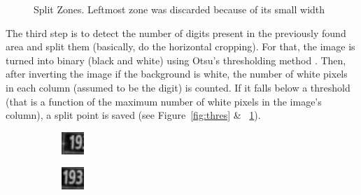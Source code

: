 \documentclass{article} %
\begin{document}
\begin{figure}[!htb]
  \caption{Split Zones. Leftmost zone was discarded because of its small width}
  \label{fig:split}
\endminipage\hfill
\end{figure}

The third step is to detect the number of digits present in the previously found area and split them (basically, do the horizontal cropping). For that, the image is turned into binary (black and white) using Otsu’s thresholding method\cite{otsu1975threshold,graythresh} . Then, after inverting the image if the background is white, the number of white pixels in each column (assumed to be the digit) is counted. If it falls below a threshold (that is a function of the maximum number of white pixels in the image’s column), a split point is saved (see Figure~\ref{fig:thres} \& ~\ref{fig:split}).


\begin{figure}
\begin{subfigure}{.3\textwidth}
  \centering
  \includegraphics[width=.8\linewidth]{images/image03}
\end{subfigure}%
\begin{subfigure}{.3\textwidth}
  \centering
  \includegraphics[width=.8\linewidth]{images/image07}

\end{subfigure}
\end{figure}
\end{document}
